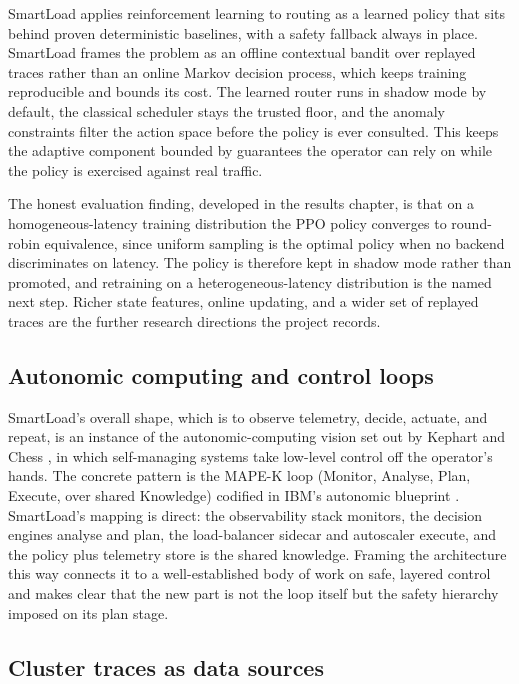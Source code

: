 SmartLoad applies reinforcement learning to routing as a learned policy that
sits behind proven deterministic baselines, with a safety fallback always in
place. SmartLoad frames the problem as an offline contextual bandit over
replayed traces \cite{guo2019alibaba} rather than an online Markov decision
process, which keeps training reproducible and bounds its cost. The learned
router runs in shadow mode by default, the classical scheduler stays the trusted
floor, and the anomaly constraints filter the action space before the policy is
ever consulted. This keeps the adaptive component bounded by guarantees the
operator can rely on while the policy is exercised against real traffic.

The honest evaluation finding, developed in the results chapter, is that on a
homogeneous-latency training distribution the PPO policy converges to
round-robin equivalence, since uniform sampling is the optimal policy when no
backend discriminates on latency. The policy is therefore kept in shadow mode
rather than promoted, and retraining on a heterogeneous-latency distribution is
the named next step. Richer state features, online updating, and a wider set of
replayed traces are the further research directions the project records.

\subsection{Autonomic computing and control loops}
\label{lit:sec:research-mapek}

SmartLoad's overall shape, which is to observe telemetry, decide, actuate, and
repeat, is an instance of the autonomic-computing vision set out by Kephart and
Chess \cite{kephart2003autonomic}, in which self-managing systems take low-level
control off the operator's hands. The concrete pattern is the MAPE-K loop
(Monitor, Analyse, Plan, Execute, over shared Knowledge) codified in IBM's
autonomic blueprint \cite{ibm2005mapek}. SmartLoad's mapping is direct: the
observability stack monitors, the decision engines analyse and plan, the
load-balancer sidecar and autoscaler execute, and the policy plus telemetry
store is the shared knowledge. Framing the architecture this way connects it to
a well-established body of work on safe, layered control and makes clear that
the new part is not the loop itself but the safety hierarchy imposed on its
plan stage.

\subsection{Cluster traces as data sources}
\label{lit:sec:research-traces}

